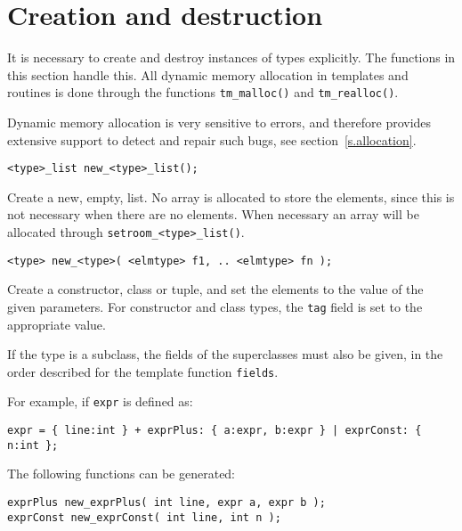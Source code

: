 \section{Creation and destruction}
It is necessary to create and destroy instances of {\Tm} types explicitly.
The functions in this section handle this.
All dynamic memory allocation in {\Tm} templates and routines is done through
the functions \verb+tm_malloc()+ and \verb+tm_realloc()+.
\par
Dynamic memory allocation is very sensitive to errors,
and therefore {\Tm} provides extensive support to detect and repair such
bugs, see section~\ref{s.allocation}.
\par
\begin{verbatim}
<type>_list new_<type>_list();
\end{verbatim}
\begin{desc}
Create a new, empty, list.
No array is allocated to store the elements,
since this is not necessary when there are no elements.
When necessary an array will be allocated through \verb+setroom_<type>_list()+.
\end{desc}
\begin{verbatim}
<type> new_<type>( <elmtype> f1, .. <elmtype> fn );
\end{verbatim}
\begin{desc}
Create a constructor, class or tuple,
and set the elements to the value of the given parameters.
For constructor and class types, the \texttt{tag} field is set to the appropriate
value.
\par
If the type is a subclass, the fields of the superclasses must also
be given, in the order described for the {\Tm} template function \texttt{fields}.
\par
For example, if \texttt{expr} is defined as:
\begin{showfile}
\begin{verbatim}
expr = { line:int } + exprPlus: { a:expr, b:expr } | exprConst: { n:int };
\end{verbatim}
\end{showfile}
The following functions can be generated:
\begin{showfile}
\begin{verbatim}
exprPlus new_exprPlus( int line, expr a, expr b );
exprConst new_exprConst( int line, int n );
\end{verbatim}
\end{showfile}
\end{desc}

